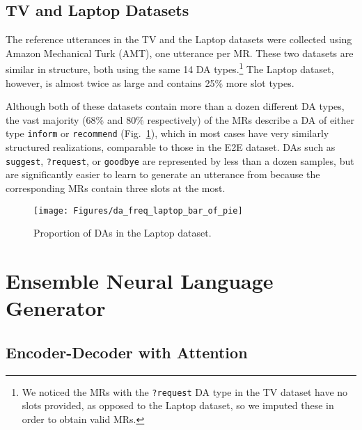 \documentclass[11pt,a4paper]{article}
\begin{document}
\subsection{TV and Laptop Datasets}

The reference utterances in the TV and the Laptop datasets were collected using Amazon Mechanical Turk (AMT), one utterance per MR. These two datasets are similar in structure, both using the same 14 DA types.\footnote{We noticed the MRs with the \texttt{?request} DA type in the TV dataset have no slots provided, as opposed to the Laptop dataset, so we imputed these in order to obtain valid MRs.} The Laptop dataset, however, is almost twice as large and contains 25\% more slot types.


Although both of these datasets contain more than a dozen different DA types, the vast majority (68\% and 80\% respectively) of the MRs describe a DA of either type \texttt{inform} or \texttt{recommend} (Fig.~\ref{fig:da_freq_laptop}), which in most cases have very similarly structured realizations, comparable to those in the E2E dataset. DAs such as \texttt{suggest}, \texttt{?request}, or \texttt{goodbye} are represented by less than a dozen samples, but are significantly easier to learn to generate an utterance from because the corresponding MRs contain three slots at the most. 

\begin{figure}
  \begin{center}
  	\texttt{[image: Figures/da\_freq\_laptop\_bar\_of\_pie]}
  \end{center}
  \vspace{-0.5cm}
  \caption{Proportion of DAs in the Laptop dataset.}
  \label{fig:da_freq_laptop}
\end{figure}



\section{Ensemble Neural Language Generator}
\label{model}


\subsection{Encoder-Decoder with Attention}
\end{document}
